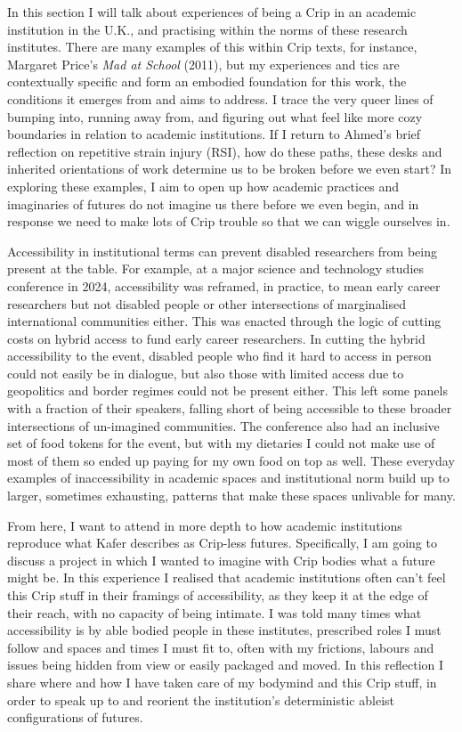 In this section I will talk about experiences of being a Crip in an
academic institution in the U.K., and practising within the norms of
these research institutes. There are many examples of this within Crip
texts, for instance, Margaret Price's \emph{Mad at School} (2011), but
my experiences and tics are contextually specific and form an embodied
foundation for this work, the conditions it emerges from and aims to
address. I trace the very queer lines of bumping into, running away
from, and figuring out what feel like more cozy boundaries in relation
to academic institutions. If I return to Ahmed's brief reflection on
repetitive strain injury (RSI), how do these paths, these desks and
inherited orientations of work determine us to be broken before we even
start? In exploring these examples, I aim to open up how academic
practices and imaginaries of futures do not imagine us there before we
even begin, and in response we need to make lots of Crip trouble so that
we can wiggle ourselves in.

Accessibility in institutional terms can prevent disabled researchers
from being present at the table. For example, at a major science and
technology studies conference in 2024, accessibility was reframed, in
practice, to mean early career researchers but not disabled people or
other intersections of marginalised international communities either.
This was enacted through the logic of cutting costs on hybrid access to
fund early career researchers. In cutting the hybrid accessibility to
the event, disabled people who find it hard to access in person could
not easily be in dialogue, but also those with limited access due to
geopolitics and border regimes could not be present either. This left
some panels with a fraction of their speakers, falling short of being
accessible to these broader intersections of un-imagined communities.
The conference also had an inclusive set of food tokens for the event,
but with my dietaries I could not make use of most of them so ended up
paying for my own food on top as well. These everyday examples of
inaccessibility in academic spaces and institutional norm build up to
larger, sometimes exhausting, patterns that make these spaces unlivable
for many.

From here, I want to attend in more depth to how academic institutions
reproduce what Kafer describes as Crip-less futures. Specifically, I am
going to discuss a project in which I wanted to imagine with Crip bodies
what a future might be. In this experience I realised that academic
institutions often can't feel this Crip stuff in their framings of
accessibility, as they keep it at the edge of their reach, with no
capacity of being intimate. I was told many times what accessibility is
by able bodied people in these institutes, prescribed roles I must
follow and spaces and times I must fit to, often with my frictions,
labours and issues being hidden from view or easily packaged and moved.
In this reflection I share where and how I have taken care of my
bodymind and this Crip stuff, in order to speak up to and reorient the
institution's deterministic ableist configurations of futures.

